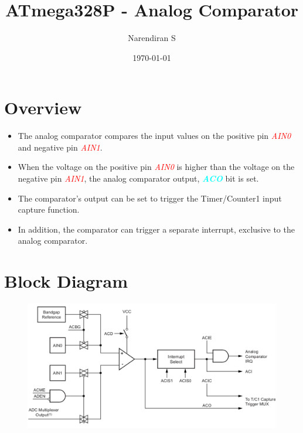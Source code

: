 \documentclass{article}
\title{ATmega328P - Analog Comparator}
\author{Narendiran S}
\date{\today}
\newcommand{\bitFormat}[1]{\emph{\textbf{\textcolor{cyan}{#1}}}}
\newcommand{\pinFormat}[1]{\emph{\textcolor{red}{#1}}}
\begin{document}
\maketitle

\section{Overview}
\begin{itemize}
    \item The analog comparator compares the input values on the positive pin \pinFormat{AIN0} and negative pin \pinFormat{AIN1}.
    \item When the voltage on the positive pin \pinFormat{AIN0} is higher than the voltage on the negative pin \pinFormat{AIN1}, the analog comparator output, \bitFormat{ACO} bit is set.
    \item The comparator’s output can be set to trigger the Timer/Counter1 input capture function.
    \item In addition, the comparator can trigger a separate interrupt, exclusive to the analog comparator. 
\end{itemize}
\section{Block Diagram}
\begin{figure}[H]
    \centering
    \includegraphics[width=1\textwidth]{AnalogComparatorBlock.png}
\end{figure}
\end{document}
